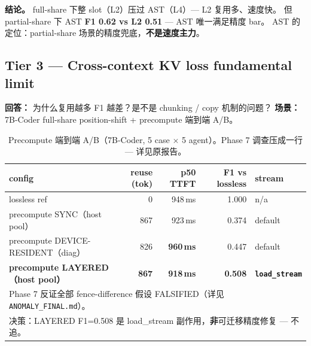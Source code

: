 \documentclass[11pt,a4paper]{article}
\begin{document}
\textbf{结论。} full-share 下整 slot（L2）压过 AST（L4）--- L2 复用多、速度快。
但 partial-share 下 AST \textbf{F1 0.62 vs L2 0.51} --- AST 唯一满足精度 bar。
AST 的定位：partial-share 场景的精度兜底，\textbf{不是速度主力}。

\subsection*{Tier 3 --- Cross-context KV loss fundamental limit}

\textbf{回答：} 为什么复用越多 F1 越差？是不是 chunking / copy 机制的问题？
\textbf{场景：} 7B-Coder full-share position-shift + precompute 端到端 A/B。

\begin{table}[h]
\centering\small
\begin{tabular}{@{}lrrrl@{}}
\toprule
\textbf{config} & \textbf{reuse (tok)} & \textbf{p50 TTFT} & \textbf{F1 vs lossless} & \textbf{stream} \\
\midrule
lossless ref                                       & 0   & 948\,ms  & 1.000   & n/a \\
precompute SYNC（host pool）                       & 867 & 923\,ms  & 0.374   & default \\
precompute DEVICE-RESIDENT（diag）                 & 826 & \textbf{960\,ms} & 0.447 & default \\
\textbf{precompute LAYERED（host pool）}           & \textbf{867} & \textbf{918\,ms} & \textbf{0.508} & \textbf{\texttt{load\_stream}} \\
\midrule
\multicolumn{5}{l}{\small Phase 7 反证全部 fence-difference 假设 FALSIFIED（详见 \texttt{ANOMALY\_FINAL.md}）。} \\
\multicolumn{5}{l}{\small 决策：LAYERED F1=0.508 是 load\_stream 副作用，\textbf{非}可迁移精度修复 --- 不追。} \\
\bottomrule
\end{tabular}
\caption{Precompute 端到端 A/B（7B-Coder, 5 case $\times$ 5 agent）。Phase 7 调查压成一行 --- 详见原报告。}
\end{table}
\end{document}
